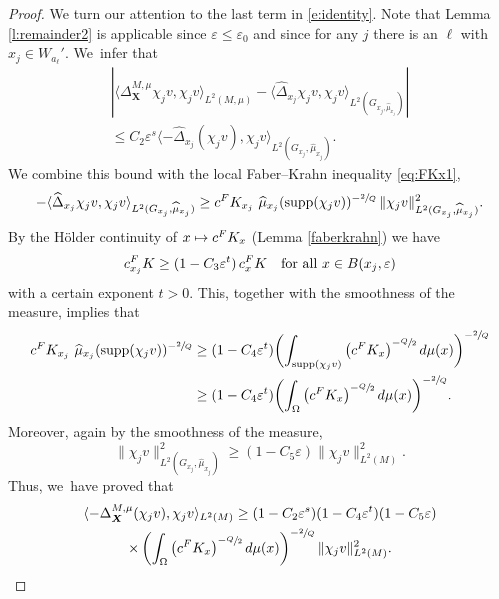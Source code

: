 \documentclass[11pt]{article}
\newcommand\mto{\mathchoice{\longmapsto}{\mapsto}{\mapsto}{\mapsto}}
\let\oldsfrac\sfrac
\renewcommand{\sfrac}[2]{{\oldsfrac{#1}{#2}}}
\newcommand{\FK}{\textup{FK}}
\newcommand{\bX}{{\boldsymbol{X}}}
\theoremstyle{definition}
\let\epsilon\varepsilon
\let\Xb\bX
\newcommand{\1}{\mathbbm{1}}
\DeclareMathOperator{\supp}{supp}
\numberwithin{equation}{section}
\begin{document}
\begin{proof}
We turn our attention to the last term in \eqref{e:identity}. Note that Lemma \ref{l:remainder2} is applicable since $\epsilon\leq\epsilon_0$ and since for any $j$ there is an $\ell$ with $x_j\in W_{a_\ell}'$. We~infer that
\begin{multline*}
\left| \langle \Delta^{M,\mu}_\Xb \chi_j v, \chi_j v \rangle_{L^2(M,\mu)} - \langle \widehat{\Delta}_{x_j} \chi_j v, \chi_j v \rangle_{L^2(G_{x_j,\widehat\mu_{x_j}})}\right| \\
\leq C_2 \varepsilon^{s} \langle - \widehat{\Delta}_{x_j} (\chi_j v), \chi_j v \rangle_{L^2(G_{x_j},\widehat\mu_{x_j})}.
\end{multline*}
We combine this bound with the local Faber--Krahn inequality \eqref{eq:FKx1},
\begin{equation}
- \langle \widehat \Delta_{x_j}\chi_jv, \chi_jv \rangle_{L^2(G_{x_j},\widehat\mu_{x_j})} \geq c^\FK_{x_j} \ \widehat\mu_{x_j}(\supp (\chi_j v))^{-\sfrac2Q} \,\|\chi_j v \|_{L^2(G_{x_j},\widehat\mu_{x_j})}^2.
\end{equation}
By the Hölder continuity of $x\mto c^\FK_x$ (Lemma \ref{faberkrahn}) we have
\[
c_{x_j}^\FK \geq (1-C_3 \epsilon^t) \,c_x^\FK
\quad\text{for all} \ x\in B(x_j,\epsilon)
\]
with a certain exponent $t>0$. This, together with the smoothness of the measure, implies that
\begin{align*}
c^\FK_{x_j} \ \widehat\mu_{x_j}(\supp (\chi_j v))^{-\sfrac2Q}
& \geq (1-C_4 \epsilon^t) \biggl(\int_{\supp(\chi_j v)} \left(c^\FK_x\right)^{-\sfrac Q2} d\mu(x) \biggr)^{-\sfrac 2Q} \\
& \geq (1-C_4 \epsilon^t) \biggl(\int_\Omega \left(c^\FK_x\right)^{-\sfrac Q2} d\mu(x) \biggr)^{-\sfrac 2Q}.
\end{align*}
Moreover, again by the smoothness of the measure,
\[
\|\chi_j v \|_{L^2(G_{x_j},\widehat\mu_{x_j})}^2 \geq (1-C_5 \varepsilon) \|\chi_j v \|_{L^2(M)}^2.
\]
Thus, we~have proved that
\begin{multline*}
\langle -\Delta^{M,\mu}_\Xb (\chi_j v),\chi_j v \rangle_{L^2(M)}\geq (1-C_2 \epsilon^s)(1-C_4 \epsilon^t) (1-C_5\epsilon) \\
\times
\left(\int_\Omega \left(c^\FK_x\right)^{-\sfrac Q2} d\mu(x)\right)^{-\sfrac 2Q}
\|\chi_j v \|_{L^2(M)}^2.
\end{multline*}


\end{proof}
\end{document}
